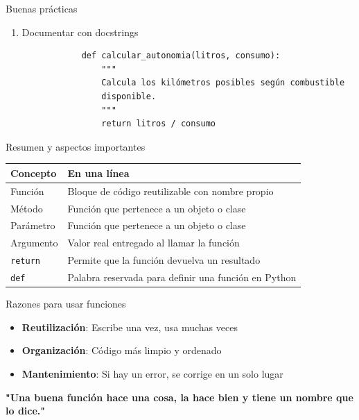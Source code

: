 \documentclass{beamer}
\begin{document}
    \begin{frame}[fragile,t]{Buenas prácticas}
        \begin{enumerate}[3]
            \item Documentar con docstrings
            \begin{verbatim}
            def calcular_autonomia(litros, consumo):
                """
                Calcula los kilómetros posibles según combustible 
                disponible.
                """
                return litros / consumo
            \end{verbatim}
        \end{enumerate}
    \end{frame}

    \begin{frame}[fragile, t]{Resumen y aspectos importantes}
        \centering
        \begin{tabular}{|p{3cm}|p{6cm}|}
            \hline
            Concepto & En una línea \\ \hline
            Función & Bloque de código reutilizable con nombre propio \\ \hline
            Método & Función que pertenece a un objeto o clase \\ \hline
            Parámetro & Función que pertenece a un objeto o clase \\ \hline
            Argumento & Valor real entregado al llamar la función \\ \hline
            \texttt{return} & Permite que la función devuelva un resultado \\ \hline
            \texttt{def} & Palabra reservada para definir una función en Python \\ \hline
        \end{tabular}
    \end{frame}

    \begin{frame}{Razones para usar funciones}
        \begin{itemize}
            \item \textbf{Reutilización}: Escribe una vez, usa muchas veces
            \item \textbf{Organización}: Código más limpio y ordenado
            \item \textbf{Mantenimiento}: Si hay un error, se corrige en un solo lugar
        \end{itemize}
        
        \textbf{"Una buena función hace una cosa, la hace bien y tiene un nombre que lo dice."}
    \end{frame}
\end{document}
